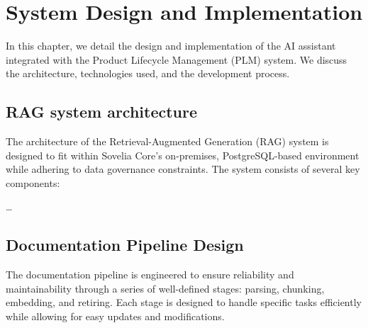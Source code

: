\chapter{System Design and Implementation}
\label{ch:system-design-and-implementation}

In this chapter, we detail the design and implementation of the AI assistant integrated with the Product Lifecycle Management (PLM) system. We discuss the architecture, technologies used, and the development process.

\section{RAG system architecture}
\label{sec:rag-system-architecture}

The architecture of the Retrieval-Augmented Generation (RAG) system is designed to fit within Sovelia Core's on-premises, PostgreSQL-based environment while adhering to data governance constraints. The system consists of several key components:

\dots

\section{Documentation Pipeline Design}
\label{sec:documentation-pipeline-design}

The documentation pipeline is engineered to ensure reliability and maintainability through a series of well-defined stages: parsing, chunking, embedding, and retiring. Each stage is designed to handle specific tasks efficiently while allowing for easy updates and modifications.
